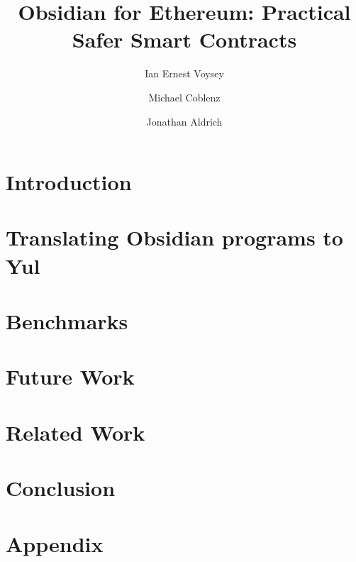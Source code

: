 \documentclass[sigplan,nonacm,screen]{acmart}
\begin{document}
\title{Obsidian for Ethereum: Practical Safer Smart Contracts}

\author{Ian Ernest Voysey}
\cmu{}

\author{Michael Coblenz}

\author{Jonathan Aldrich}
\cmu{}

\maketitle

\section{Introduction}\label{sec:intro}


\section{Translating Obsidian programs to Yul}\label{sec:layout}


\section{Benchmarks}\label{sec:benchmarks}


\section{Future Work}\label{sec:futurework}


\section{Related Work}\label{sec:relatedwork}


\section{Conclusion}\label{sec:conclusion}


\clearpage



\appendix
\clearpage
\section{Appendix}
\end{document}
